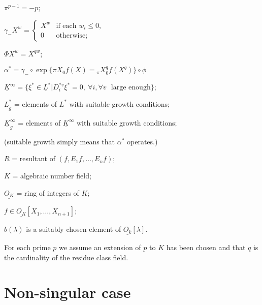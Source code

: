 \smallskip

$\pi^{p-1}=-p$;

\smallskip

$\gamma_{-}X^{w}=\begin{cases} X^{w} & \text{if each } w_{i}\leq 0,\\
0 & \text{otherwise;}\end{cases}$

\smallskip

$\Phi X^{w}=X^{qw}$;

\smallskip

$\alpha^{*}=\gamma_{-}\circ \exp \{\pi X_{0}f(X)={}_{\pi}X^{q}_{0}f(X^{q})\}\circ \phi$\pageoriginale

\smallskip

$\underline{K}^{\infty}=\{\xi^{*}\in \underline{L}^{*}|D^{*v}_{i}\xi^{*}=0, \ \forall i, \forall v\text{~ large enough}\}$;

\smallskip

$\underline{L}^{*}_{g}$ = elements of $\underline{L}^{*}$ with suitable growth conditions;

\smallskip

$\underline{K}^{\infty}_{g}$ = elements of $\underline{K}^{\infty}$ with suitable growth conditions;

\smallskip

(suitable growth simply means that $\alpha^{*}$ operates.)

\smallskip

$R$ = resultant of $(f,E_{1}f,\ldots,E_{n}f)$;

\smallskip

$K$ = algebraic number field;

\smallskip

$\underline{O_{K}}$ = ring of integers of $K$;

\smallskip

$f\in \underline{O_{K}}[X_{1},\ldots,X_{n+1}]$;

\smallskip

$b(\lambda)$ is a suitably chosen element of $\underline{O_{k}}[\lambda]$.

\smallskip

For each prime $p$ we assume an extension of $p$ to $K$ has been chosen and that $q$ is the cardinality of the residue class field.

\section{Non-singular case}\label{art07-sec2}

